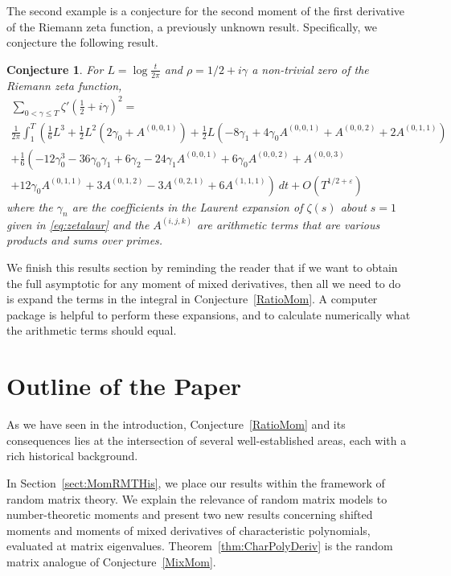 \documentclass[12pt,a4paper,reqno]{amsart}
\newtheorem{conjecture}{Conjecture}
\theoremstyle{remark}
\numberwithin{equation}{section}
\begin{document}
The second example is a conjecture for the second moment of the first derivative of the Riemann zeta function, a previously unknown result. Specifically, we conjecture the following result.
\begin{conjecture}\label{conj:secmom}
	For $L = \log \frac{t}{2\pi}$ and $\rho=1/2 + i\gamma$ a non-trivial zero of the Riemann zeta function,
	\begin{multline*}
		\sum_{0 < \gamma \leq T} \zeta ' \left(\frac{1}{2} + i \gamma \right)^2 = \\
		\frac{1}{2 \pi} \int_{1}^{T} \left( \frac{1}{6}L^3 + \frac{1}{2}L^2 \left(2\gamma_0 +A^{(0,0,1)}  \right) \right. + \frac{1}{2} L \left( -8\gamma_1 + 4\gamma_0 A^{(0,0,1)} + A^{(0,0,2)}  + 2A^{(0,1,1)} \right) \\
		+ \frac{1}{6} \left( -12\gamma_0^3 - 36\gamma_0 \gamma_1 + 6\gamma_2 -24 \gamma_1 A^{(0,0,1)} + 6 \gamma_0 A^{(0,0,2)} + A^{(0,0,3)} \right. \\
		\left. + 12 \gamma_0 A^{(0,1,1)} + 3 A^{(0,1,2)}  -3 A^{(0,2,1)} +6 A^{(1,1,1)}  \right) \ dt + O\left(T^{1/2 +\varepsilon}\right)
	\end{multline*}
	where the $\gamma_n$ are the coefficients in the Laurent expansion of $\zeta (s)$ about $s=1$ given in \eqref{eq:zetalaur} and the $A^{(i,j,k)}$ are arithmetic terms that are various products and sums over primes.
\end{conjecture}

We finish this results section by reminding the reader that if we want to obtain the full asymptotic for any moment of mixed derivatives, then all we need to do is expand the terms in the integral in Conjecture~\ref{RatioMom}. A computer package is helpful to perform these expansions, and to calculate numerically what the arithmetic terms should equal.

\section{Outline of the Paper}
As we have seen in the introduction, Conjecture~\ref{RatioMom} and its consequences lies at the intersection of several well-established areas, each with a rich historical background.

In Section~\ref{sect:MomRMTHis}, we place our results within the framework of random matrix theory. We explain the relevance of random matrix models to number-theoretic moments and present two new results concerning shifted moments and moments of mixed derivatives of characteristic polynomials, evaluated at matrix eigenvalues. Theorem~\ref{thm:CharPolyDeriv} is the random matrix analogue of Conjecture~\ref{MixMom}.
\end{document}
